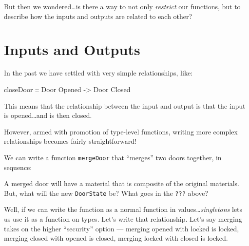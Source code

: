 \documentclass[]{article}
\newenvironment{Shaded}{}{}
\newcommand{\DataTypeTok}[1]{\textcolor[rgb]{0.56,0.13,0.00}{#1}}
\newcommand{\NormalTok}[1]{#1}
\newcommand{\OperatorTok}[1]{\textcolor[rgb]{0.40,0.40,0.40}{#1}}
\newcommand{\OtherTok}[1]{\textcolor[rgb]{0.00,0.44,0.13}{#1}}
\newcommand{\StringTok}[1]{\textcolor[rgb]{0.25,0.44,0.63}{#1}}
\begin{document}
But then we wondered\ldots is there a way to not only \emph{restrict} our
functions, but to describe how the inputs and outputs are related to each other?

\section{Inputs and Outputs}\label{inputs-and-outputs}

In the past we have settled with very simple relationships, like:

\begin{Shaded}
\begin{Highlighting}[]
\OtherTok{closeDoor ::} \DataTypeTok{Door} \DataTypeTok{\textquotesingle{}Opened} \OtherTok{{-}\textgreater{}} \DataTypeTok{Door} \DataTypeTok{\textquotesingle{}Closed}
\end{Highlighting}
\end{Shaded}

This means that the relationship between the input and output is that the input
is opened\ldots and is then closed.

However, armed with promotion of type-level functions, writing more complex
relationships becomes fairly straightforward!

We can write a function \texttt{mergeDoor} that ``merges'' two doors together,
in sequence:

\begin{Shaded}
\end{Shaded}

A merged door will have a material that is composite of the original materials.
But, what will the new \texttt{DoorState} be? What goes in the \texttt{???}
above?

Well, if we can write the function as a normal function in
values\ldots{}\emph{singletons} lets us use it as a function on types. Let's
write that relationship. Let's say merging takes on the higher ``security''
option --- merging opened with locked is locked, merging closed with opened is
closed, merging locked with closed is locked.
\end{document}
